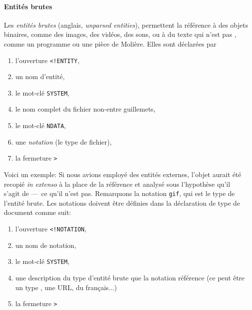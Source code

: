 \paragraph{Entités brutes}

Les \emph{entités brutes} (anglais, \emph{unparsed entities}),
permettent la référence à des objets binaires, comme des images, des
vidéos, des sons, ou à du texte qui n'est pas \XML, comme un programme
ou une pièce de Molière. Elles sont déclarées par
\begin{enumerate}

  \item l'ouverture \verb|<!ENTITY|,

  \item un nom d'entité,

  \item le mot-clé \verb|SYSTEM|,

  \item le nom complet du fichier non-\XML entre guillemets,

  \item le mot-clé \verb|NDATA|,

  \item une \emph{notation} (le type de fichier),

  \item la fermeture \verb|>|

\end{enumerate}
Voici un exemple:
\noindent Si nous avions employé des entités externes, l'objet aurait
été recopié \emph{in extenso} à la place de la référence et analysé
sous l'hypothèse qu'il s'agit de \XML ---~ce qu'il n'est
pas. Remarquons la notation \texttt{gif}, qui est le type de l'entité
brute. Les notations doivent être définies dans la déclaration de type
de document comme suit:
\begin{enumerate}

  \item l'ouverture \verb|<!NOTATION|,

  \item un nom de notation,

  \item le mot-clé \verb|SYSTEM|,

  \item une description du type d'entité brute que la notation
    référence (ce peut être un type \MIME, une URL, du français...)

  \item la fermeture \verb|>|

\end{enumerate}
